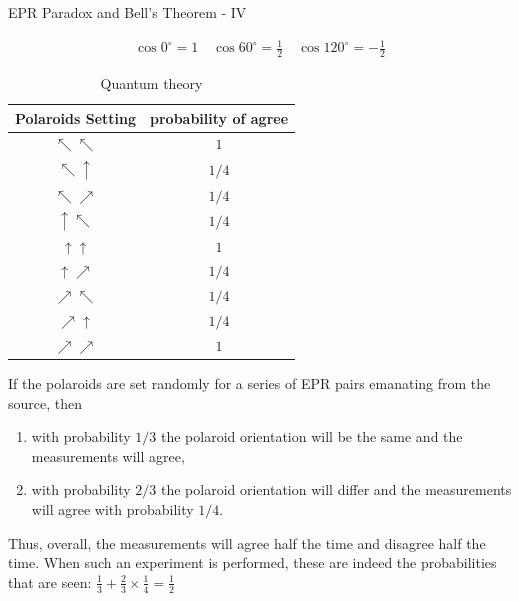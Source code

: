 \documentclass{beamer}
\begin{document}
\begin{frame}{EPR Paradox and Bell's Theorem - IV}
  {\tiny
    \begin{align*}
      \cos 0^{\circ} = 1 \quad
      \cos 60^{\circ} = \frac{1}{2} \quad
      \cos 120^{\circ} = -\frac{1}{2}
    \end{align*}
    \begin{table}[h!]
    \begin{center}
      \caption{Quantum theory}
      \label{tab:table1}
      \begin{tabular}{c|c}
          Polaroids Setting & probability of agree \\
        \hline
        $\nwarrow \nwarrow$ & $1$\\
        $\nwarrow \uparrow$ & $1/4$\\
        $\nwarrow \nearrow$ & $1/4$\\
        $\uparrow \nwarrow$ & $1/4$\\
        $\uparrow \uparrow$ & $1$ \\
        $\uparrow \nearrow$ & $1/4$ \\
        $\nearrow \nwarrow$ & $1/4$\\
        $\nearrow \uparrow$ & $1/4$ \\
        $\nearrow \nearrow$ & $1$\\
      \end{tabular}
    \end{center}
    \end{table}
    If the polaroids are set randomly for a series of EPR pairs emanating from the source, then
    \begin{enumerate}[I]
    \item with probability $1/3$ the polaroid orientation will be the same and the measurements will agree,
    \item with probability $2/3$ the polaroid orientation will differ and the measurements will agree with probability $1/4$.
    \end{enumerate}
  Thus, overall, the measurements will agree half the time and disagree half the time. When such
  an experiment is performed, these are indeed the probabilities that are seen:
  $\frac{1}{3} + \frac{2}{3} \times \frac{1}{4} = \frac{1}{2}$
  }%
\end{frame}
\end{document}
